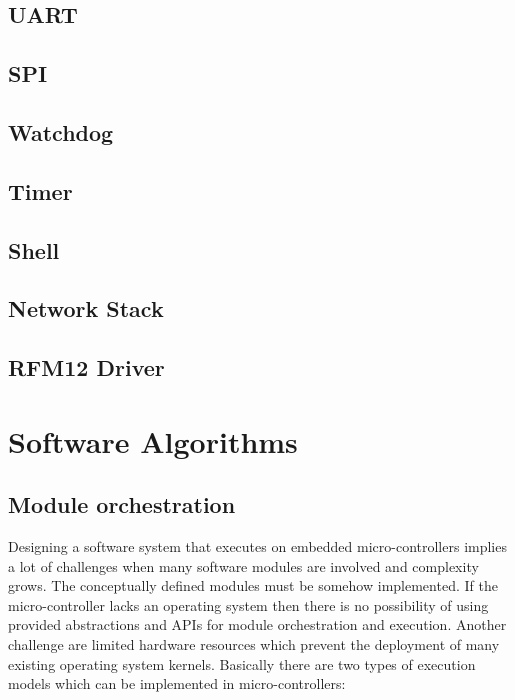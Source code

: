 \section{UART}
\section{SPI}
\section{Watchdog}
\section{Timer}
\section{Shell}
\section{Network Stack}
\section{RFM12 Driver}

\chapter{Software Algorithms}
\section{Module orchestration}
Designing a software system that executes on embedded micro-controllers implies a lot of challenges when many software modules are involved and complexity grows. The conceptually defined modules must be somehow implemented. If the micro-controller lacks an operating system then there is no possibility of using provided abstractions and APIs for module orchestration and execution. Another challenge are limited hardware resources which prevent the deployment of many existing operating system kernels. Basically there are two types of execution models which can be implemented in micro-controllers:

